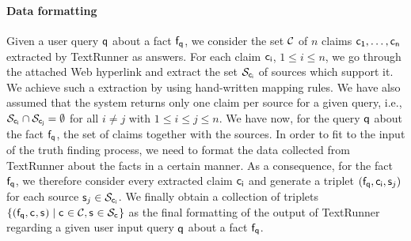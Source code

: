 \paragraph*{Data formatting}
Given a user query $\mathsf{q}$ about a fact $\mathsf{f}_{\mathsf{q}}$, we consider the set $\mathcal{C}$ of $n$ 
claims $\mathsf{c_{1}}, \ldots, \mathsf{c_{n}}$ extracted by TextRunner as answers. For each claim $\mathsf{c_{i}}$,
$1\leq i\leq n$, we go through the attached Web hyperlink and extract the set $\mathcal{S}_{\mathsf{c_{i}}}$ of 
sources which support it. We achieve such a extraction by using hand-written mapping rules. We have also
assumed that the system returns only one claim per source for a given query, i.e., $\mathcal{S}_{\mathsf{c_{i}}}
\cap \mathcal{S}_{\mathsf{c_{j}}}=\emptyset$ for all $i\neq j$ with $1\leq i\leq j\leq n$. We have now, for the query
$\mathsf{q}$ about the fact $\mathsf{f}_{\mathsf{q}}$, the set of claims together with the sources. In order to fit to 
the input of the truth finding process, we need to format the data collected from TextRunner about the 
facts in a certain manner. As a consequence, for the fact $\mathsf{f}_{\mathsf{q}}$, we therefore consider every extracted 
claim $\mathsf{c_{i}}$ and generate a triplet $(\mathsf{f}_{\mathsf{q}}, \mathsf{c_{i}}, \mathsf{s}_{j})$ for each source $\mathsf{s}_{j}\in \mathcal{S}_{\mathsf{c_{i}}}$.
We finally obtain a collection of triplets $\{(\mathsf{f}_{\mathsf{q}}, \mathsf{c_{}}, \mathsf{s}_{})\mid \mathsf{c_{}}\in \mathcal{C}, \mathsf{s}_{} \in \mathcal{S}_{\mathsf{c_{}}}\}$ 
as the final formatting of the output of TextRunner regarding a given user input query $\mathsf{q}$ about a fact $\mathsf{f}_{\mathsf{q}}$. 


